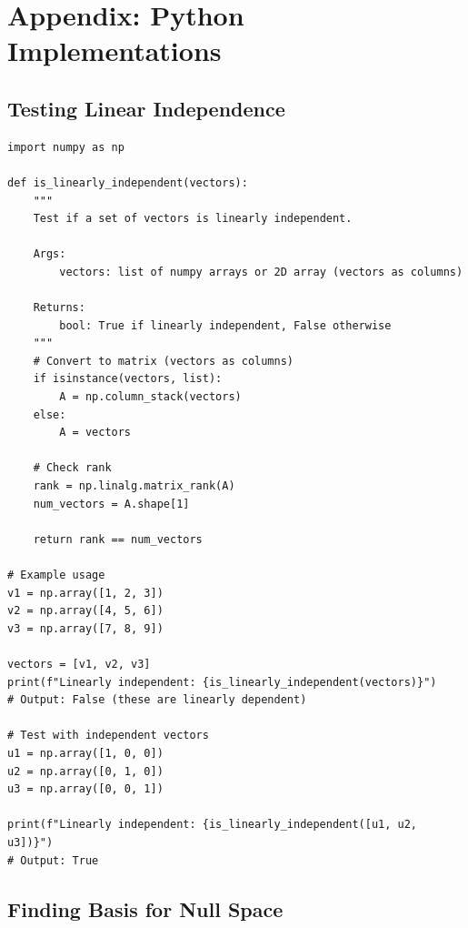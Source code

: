 \documentclass[12pt,a4paper]{article}
\theoremstyle{definition}
\begin{document}
\section{Appendix: Python Implementations}

\subsection{Testing Linear Independence}

\begin{verbatim}
import numpy as np

def is_linearly_independent(vectors):
    """
    Test if a set of vectors is linearly independent.
    
    Args:
        vectors: list of numpy arrays or 2D array (vectors as columns)
    
    Returns:
        bool: True if linearly independent, False otherwise
    """
    # Convert to matrix (vectors as columns)
    if isinstance(vectors, list):
        A = np.column_stack(vectors)
    else:
        A = vectors
    
    # Check rank
    rank = np.linalg.matrix_rank(A)
    num_vectors = A.shape[1]
    
    return rank == num_vectors

# Example usage
v1 = np.array([1, 2, 3])
v2 = np.array([4, 5, 6])
v3 = np.array([7, 8, 9])

vectors = [v1, v2, v3]
print(f"Linearly independent: {is_linearly_independent(vectors)}")
# Output: False (these are linearly dependent)

# Test with independent vectors
u1 = np.array([1, 0, 0])
u2 = np.array([0, 1, 0])
u3 = np.array([0, 0, 1])

print(f"Linearly independent: {is_linearly_independent([u1, u2, u3])}")
# Output: True
\end{verbatim}

\subsection{Finding Basis for Null Space}
\end{document}
